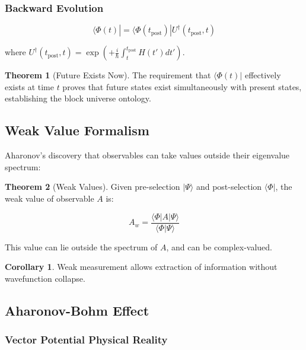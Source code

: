 \documentclass[12pt,a4paper]{article}
\theoremstyle{definition}
\newtheorem{theorem}{Theorem}[section]
\newtheorem{corollary}{Corollary}[section]
\begin{document}
\subsubsection{Backward Evolution}

\begin{equation}
\langle \Phi(t)| = \langle \Phi(t_{\text{post}})| U^\dagger(t_{\text{post}}, t)
\end{equation}

where $U^\dagger(t_{\text{post}}, t) = \exp\left(+\frac{i}{\hbar} \int_t^{t_{\text{post}}} H(t') dt'\right)$.

\begin{theorem}[Future Exists Now]
The requirement that $\langle \Phi(t)|$ effectively exists at time $t$ proves that future states exist simultaneously with present states, establishing the block universe ontology.
\end{theorem}

\subsection{Weak Value Formalism}

Aharonov's discovery that observables can take values outside their eigenvalue spectrum:

\begin{theorem}[Weak Values]
Given pre-selection $|\Psi\rangle$ and post-selection $\langle \Phi|$, the weak value of observable $A$ is:

\begin{equation}
A_w = \frac{\langle \Phi| A |\Psi\rangle}{\langle \Phi|\Psi\rangle}
\end{equation}

This value can lie outside the spectrum of $A$, and can be complex-valued.
\end{theorem}

\begin{corollary}
Weak measurement allows extraction of information without wavefunction collapse.
\end{corollary}

\subsection{Aharonov-Bohm Effect}

\subsubsection{Vector Potential Physical Reality}
\end{document}
